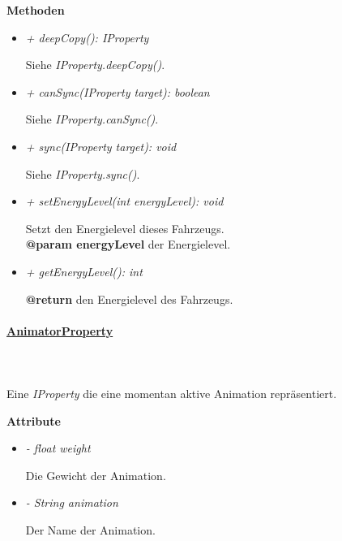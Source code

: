             \textbf{Methoden}
            \begin{itemize}
                \item \textit{+ deepCopy(): IProperty}
                    \begin{leftbar}[0.9\linewidth]
                        Siehe \textit{IProperty.deepCopy()}.
                    \end{leftbar}
                \item \textit{+ canSync(IProperty target): boolean}
                    \begin{leftbar}[0.9\linewidth]
                        Siehe \textit{IProperty.canSync()}.
                    \end{leftbar}
                \item \textit{+ sync(IProperty target): void}
                    \begin{leftbar}[0.9\linewidth]
                        Siehe \textit{IProperty.sync()}.
                    \end{leftbar}
                \item \textit{+ setEnergyLevel(int energyLevel): void}
                    \begin{leftbar}[0.9\linewidth]
                        Setzt den Energielevel dieses Fahrzeugs.\\
                        \textbf{@param energyLevel} der Energielevel.
                    \end{leftbar}
                \item \textit{+ getEnergyLevel(): int}
                    \begin{leftbar}[0.9\linewidth]
                        \textbf{@return} den Energielevel des Fahrzeugs.
                    \end{leftbar}
            \end{itemize}

        \paragraph{\underline{AnimatorProperty}} \mbox{}\\
        \\
            Eine \textit{IProperty} die eine momentan aktive Animation repräsentiert.\par

            \textbf{Attribute}
            \begin{itemize}
                \item \textit{- float weight}
                    \begin{leftbar}[0.9\linewidth]
                        Die Gewicht der Animation.
                    \end{leftbar}
                \item \textit{- String animation}
                    \begin{leftbar}[0.9\linewidth]
                        Der Name der Animation.
                    \end{leftbar}
            \end{itemize}

